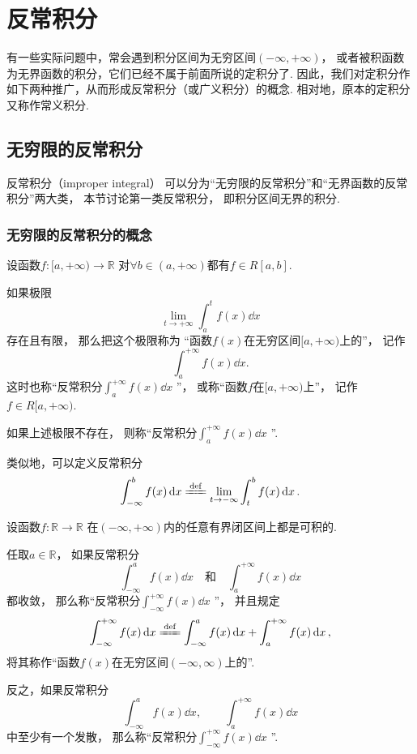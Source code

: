 \chapter{反常积分}
有一些实际问题中，常会遇到积分区间为无穷区间\((-\infty,+\infty)\)，
或者被积函数为无界函数的积分，它们已经不属于前面所说的定积分了.
因此，我们对定积分作如下两种推广，从而形成反常积分（或广义积分）的概念.
相对地，原本的定积分又称作常义积分.

\section{无穷限的反常积分}
反常积分（improper integral）
可以分为“无穷限的反常积分”和“无界函数的反常积分”两大类，
本节讨论第一类反常积分，
即积分区间无界的积分.

\subsection{无穷限的反常积分的概念}
\begin{definition}\label{definition:定积分.无穷限的反常积分的定义1}
设函数\(f\colon[a,+\infty)\to\mathbb{R}\)
对\(\forall b\in(a,+\infty)\)都有\(f \in R[a,b]\).

如果极限\[
	\lim_{t \to +\infty} \int_a^t f(x) \dd{x}
\]存在且有限，
那么把这个极限称为
“函数\(f(x)\)在无穷区间\([a,+\infty)\)上的”，
记作\[
	\int_a^{+\infty} f(x) \dd{x}.
\]
这时也称“反常积分\(\int_a^{+\infty} f(x) \dd{x}\) ”，
或称“函数\(f\)在\([a,+\infty)\)上”，
记作\(f \in R[a,+\infty)\).

如果上述极限不存在，
则称“反常积分\(\int_a^{+\infty} f(x) \dd{x}\) ”.
\end{definition}

类似地，可以定义反常积分\[
	\int_{-\infty}^b f(x) \dd{x}
	\defeq
	\lim_{t \to -\infty} \int_t^b f(x) \dd{x}.
\]

\begin{definition}\label{definition:定积分.无穷限的反常积分的定义3}
设函数\(f\colon\mathbb{R}\to\mathbb{R}\)
在\((-\infty,+\infty)\)内的任意有界闭区间上都是可积的.

任取\(a\in\mathbb{R}\)，
如果反常积分\[
	\int_{-\infty}^a f(x) \dd{x}
	\quad\text{和}\quad
	\int_a^{+\infty} f(x) \dd{x}
\]都收敛，
那么称“反常积分\(\int_{-\infty}^{+\infty} f(x) \dd{x}\) ”，
并且规定\[
	\int_{-\infty}^{+\infty} f(x) \dd{x}
	\defeq
	\int_{-\infty}^a f(x) \dd{x} + \int_a^{+\infty} f(x) \dd{x},
\]
将其称作“函数\(f(x)\)在无穷区间\((-\infty,\infty)\)上的”.

反之，如果反常积分\[
	\int_{-\infty}^a f(x) \dd{x}, \qquad
	\int_a^{+\infty} f(x) \dd{x}
\]中至少有一个发散，
那么称“反常积分\(\int_{-\infty}^{+\infty} f(x) \dd{x}\) ”.
\end{definition}

